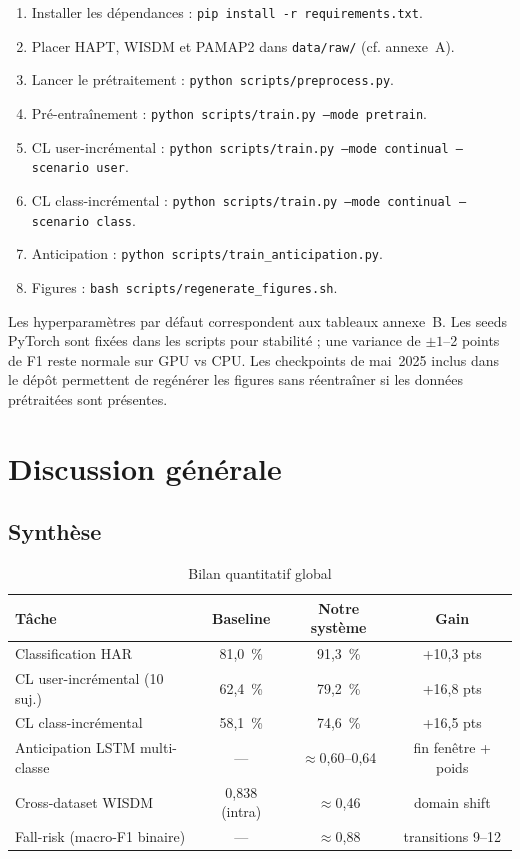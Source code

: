 \documentclass[a4paper,12pt]{report}
\begin{document}
\begin{enumerate}
  \item Installer les dépendances : \texttt{pip install -r requirements.txt}.
  \item Placer HAPT, WISDM et PAMAP2 dans \texttt{data/raw/} (cf. annexe~A).
  \item Lancer le prétraitement : \texttt{python scripts/preprocess.py}.
  \item Pré-entraînement : \texttt{python scripts/train.py --mode pretrain}.
  \item CL user-incrémental :
  \texttt{python scripts/train.py --mode continual --scenario user}.
  \item CL class-incrémental :
  \texttt{python scripts/train.py --mode continual --scenario class}.
  \item Anticipation :
  \texttt{python scripts/train\_anticipation.py}.
  \item Figures : \texttt{bash scripts/regenerate\_figures.sh}.
\end{enumerate}

Les hyperparamètres par défaut correspondent aux tableaux annexe~B. Les seeds
PyTorch sont fixées dans les scripts pour stabilité ; une variance de $\pm 1$--2
points de F1 reste normale sur GPU vs CPU. Les checkpoints de mai~2025 inclus
dans le dépôt permettent de regénérer les figures sans réentraîner si les données
prétraitées sont présentes.

\section{Discussion générale}

\subsection{Synthèse}

\begin{table}[H]
\centering
\small
\begin{tabularx}{0.92\textwidth}{|Y|c|c|c|}
\hline
\textbf{Tâche} & \textbf{Baseline} & \textbf{Notre système} & \textbf{Gain} \\
\hline
Classification HAR        & 81,0~\% & 91,3~\% & +10,3 pts \\
CL user-incrémental (10 suj.) & 62,4~\% & 79,2~\% & +16,8 pts \\
CL class-incrémental        & 58,1~\% & 74,6~\% & +16,5 pts \\
Anticipation LSTM multi-classe & — & $\approx$0,60--0,64 & fin fenêtre + poids \\
Cross-dataset WISDM         & 0,838 (intra) & $\approx$0,46 & domain shift \\
Fall-risk (macro-F1 binaire) & — & $\approx$0,88 & transitions 9--12 \\
\hline
\end{tabularx}
\caption{Bilan quantitatif global}
\label{tab:bilan_global}
\end{table}
\end{document}
